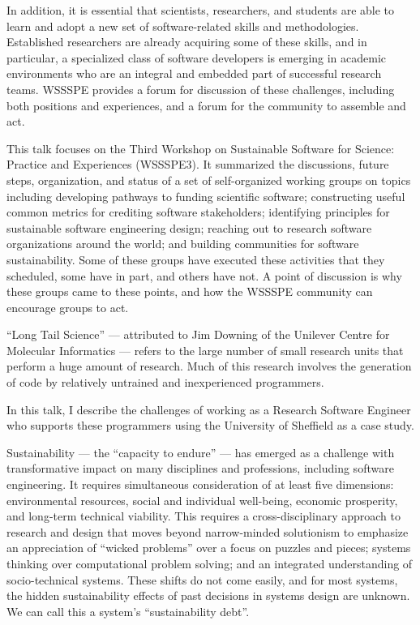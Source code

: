 \documentclass[a4paper,UKenglish]{dagrep}
\begin{document}
In addition, it is essential that scientists, researchers, and students are able to learn and adopt a new set of software-related skills and methodologies. Established researchers are already acquiring some of these skills, and in particular, a specialized class of software developers is emerging in academic environments who are an integral and embedded part of successful research teams. WSSSPE provides a forum for discussion of these challenges, including both positions and experiences, and a forum for the community to assemble and act.

This talk focuses on the Third Workshop on Sustainable Software for Science: Practice and Experiences (WSSSPE3). It summarized the discussions, future steps, organization, and status of a set of self-organized working groups on topics including developing pathways to funding scientific software; constructing useful common metrics for crediting software stakeholders; identifying principles for sustainable software engineering design; reaching out to research software organizations around the world; and building communities for software sustainability. Some of these groups have executed these activities that they scheduled, some have in part, and others have not.  A point of discussion is why these groups came to these points, and how the WSSSPE community can encourage groups to act.


``Long Tail Science'' --- attributed to Jim Downing of the Unilever Centre for Molecular Informatics --- refers to the large number of small research units that perform a huge amount of research. Much of this research involves the generation of code by relatively untrained and inexperienced programmers.

In this talk, I describe the challenges of working as a Research Software Engineer who supports these programmers using the University of Sheffield as a case study.


Sustainability --- the ``capacity to endure'' --- has emerged as a challenge with transformative impact on many disciplines and professions, including software engineering. It requires simultaneous consideration of at least five dimensions: environmental resources, social and individual well-being, economic prosperity, and long-term technical viability. This requires a cross-disciplinary approach to research and design that moves beyond narrow-minded solutionism to emphasize an appreciation of ``wicked problems'' over a focus on puzzles and pieces; systems thinking over computational problem solving; and an integrated understanding of socio-technical systems. These shifts do not come easily, and for most systems, the hidden sustainability effects of past decisions in systems design are unknown. We can call this a system's ``sustainability debt''.
\end{document}
